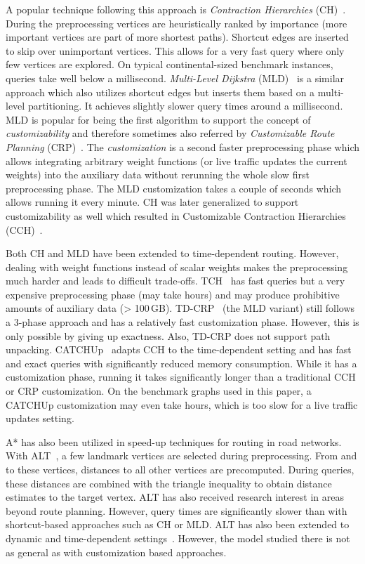 \documentclass[a4paper,UKenglish,cleveref, autoref, thm-restate,anonymous]{lipics-v2021}
\begin{document}
A popular technique following this approach is \emph{Contraction Hierarchies} (CH)~\cite{gssv-erlrn-12}.
During the preprocessing vertices are heuristically ranked by importance (more important vertices are part of more shortest paths).
Shortcut edges are inserted to skip over unimportant vertices.
This allows for a very fast query where only few vertices are explored.
On typical continental-sized benchmark instances, queries take well below a millisecond.
\emph{Multi-Level Dijkstra} (MLD)~\cite{swz-umlgt-02} is a similar approach which also utilizes shortcut edges but inserts them based on a multi-level partitioning.
It achieves slightly slower query times around a millisecond.
MLD is popular for being the first algorithm to support the concept of \emph{customizability} and therefore sometimes also referred by \emph{Customizable Route Planning} (CRP)~\cite{dgpw-crprn-13}.
The \emph{customization} is a second faster preprocessing phase which allows integrating arbitrary weight functions (or live traffic updates the current weights) into the auxiliary data without rerunning the whole slow first preprocessing phase.
The MLD customization takes a couple of seconds which allows running it every minute.
CH was later generalized to support customizability as well which resulted in Customizable Contraction Hierarchies (CCH)~\cite{dsw-cch-15}.

Both CH and MLD have been extended to time-dependent routing.
However, dealing with weight functions instead of scalar weights makes the preprocessing much harder and leads to difficult trade-offs.
TCH~\cite{bgsv-mtdtt-13} has fast queries but a very expensive preprocessing phase (may take hours) and may produce prohibitive amounts of auxiliary data (> 100\,GB).
TD-CRP~\cite{bdpw-dtdrp-16} (the MLD variant) still follows a 3-phase approach and has a relatively fast customization phase.
However, this is only possible by giving up exactness.
Also, TD-CRP does not support path unpacking.
CATCHUp~\cite{swz-sfert-21} adapts CCH to the time-dependent setting and has fast and exact queries with significantly reduced memory consumption.
While it has a customization phase, running it takes significantly longer than a traditional CCH or CRP customization.
On the benchmark graphs used in this paper, a CATCHUp customization may even take hours, which is too slow for a live traffic updates setting.

A* has also been utilized in speed-up techniques for routing in road networks.
With ALT~\cite{gh-cspas-05,gw-cppsp-05}, a few landmark vertices are selected during preprocessing.
From and to these vertices, distances to all other vertices are precomputed.
During queries, these distances are combined with the triangle inequality to obtain distance estimates to the target vertex.
ALT has also received research interest in areas beyond route planning.
However, query times are significantly slower than with shortcut-based approaches such as CH or MLD.
ALT has also been extended to dynamic and time-dependent settings~\cite{dn-crdtd-12}. %
However, the model studied there is not as general as with customization based approaches.
\end{document}
